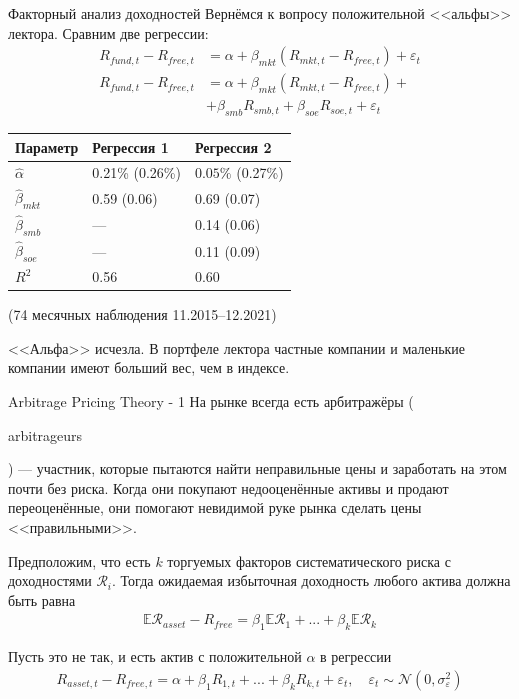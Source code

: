 \documentclass{beamer}
\newcommand{\en}[1]{\begin{otherlanguage}{english}#1\end{otherlanguage}}
\begin{document}
\begin{frame}{Факторный анализ доходностей}
\justify
Вернёмся к вопросу положительной <<альфы>> лектора. Сравним две регрессии:
\begin{align*}
R_{fund,t} - R_{free,t} &=
\alpha + \beta_{mkt}(R_{mkt,t} - R_{free,t}) + \varepsilon_t
\\
R_{fund,t} - R_{free,t} &=
\alpha + \beta_{mkt}(R_{mkt,t} - R_{free,t}) + \\
&+ \beta_{smb}R_{smb,t} + \beta_{soe}R_{soe,t} + \varepsilon_t
\end{align*}

\centering
\begin{tabular}{l|l|l}
Параметр            & Регрессия 1                   & Регрессия 2 \\ \hline
$\hat{\alpha}$      & 0.21\% {\scriptsize (0.26\%)} & $0.05\%$
{\scriptsize (0.27\%)} \\
$\hat{\beta}_{mkt}$ & 0.59 {\scriptsize (0.06)}     & 0.69
{\scriptsize (0.07)} \\
$\hat{\beta}_{smb}$ & ---                           & 0.14 \scriptsize{(0.06)} \\
$\hat{\beta}_{soe}$ & ---                           & 0.11
{\scriptsize (0.09)} \\
$R^2$               & 0.56                          & 0.60 \\ \hline
\end{tabular}

{\scriptsize (74 месячных наблюдения 11.2015--12.2021)}

\justify
<<Альфа>> исчезла. В портфеле лектора частные компании и маленькие компании имеют больший вес, чем в индексе.
\end{frame}



\begin{frame}{Arbitrage Pricing Theory - 1}
\justify
На рынке всегда есть арбитражёры (\en{arbitrageurs}) --- участник, которые 
пытаются найти неправильные цены и заработать на этом почти без риска. Когда
они покупают недооценённые активы и продают переоценённые, они помогают
невидимой руке рынка сделать цены <<правильными>>.

\justify
Предположим, что есть $k$ торгуемых факторов систематического риска с 
доходностями $\mathcal{R}_i$. Тогда ожидаемая избыточная доходность любого 
актива должна быть равна
\begin{align*}
\mathbb{E}\mathcal{R}_{asset} - R_{free} =
\beta_1\mathbb{E}\mathcal{R}_1 + ... + \beta_k\mathbb{E}\mathcal{R}_k
\end{align*}

\justify
Пусть это не так, и есть актив с положительной $\alpha$ в регрессии
\begin{align*}
R_{asset,t} - R_{free,t} =
\alpha + \beta_1R_{1,t} + ... + \beta_kR_{k,t} 
+ \varepsilon_t,\quad
\varepsilon_t \sim \mathcal{N}(0, \sigma_{\varepsilon}^2)
\end{align*}
\end{frame}
\end{document}
